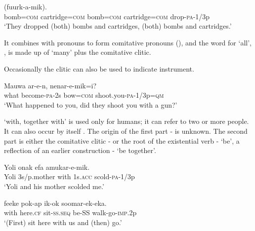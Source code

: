 \ea%
\label{ex:3:x777}
\gll {}    (fuurk-a-mik). \\
bomb=\textsc{com} cartridge=\textsc{com} bomb=\textsc{com} cartridge=\textsc{com} drop-\textsc{pa}-1/3p\\
\glt`They dropped (both) bombs and cartridges, (both) bombs and cartridges.'
\z

It combines with pronouns to form comitative pronouns (), and the word for `all', , is made up of  `many' plus the comitative clitic.

Occasionally the clitic can also be used to indicate instrument. 

\ea%
\label{ex:3:x778}
\gll Mauwa ar-e-n,  nenar-e-mik=i? \\
what become-\textsc{pa}-2s bow=\textsc{com} shoot.you-\textsc{pa}-1/3p=\textsc{qm}\\
\glt`What happened to you, did they shoot you with a gun?'
\z

 `with, together with' is used only for humans; it can refer to two or more people. It can also occur by itself . The origin of the first part - is unknown. The second part is either the comitative clitic - or the root of the existential verb \nobreakdash- `be', a reflection of an earlier construction \nobreakdash- `be together'. 

\ea%
\label{ex:3:x821}
\gll Yoli onak  efa amukar-e-mik. \\
Yoli 3s/p.mother with 1s.\textsc{acc} scold-\textsc{pa}-1/3p\\
\glt`Yoli and his mother scolded me.'
\z

\ea%
\label{ex:3:x822}
\gll {} feeke pok-ap ik-ok soomar-ek-eka. \\
with here.\textsc{cf} sit-\textsc{ss}.\textsc{seq} be-SS walk-go-\textsc{imp}.2p\\
\glt`(First) sit here with us and (then) go.'
\z

